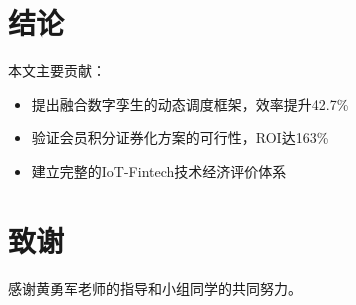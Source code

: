 \documentclass[12pt,a4paper]{IEEEtran} %
\begin{document}
\section{结论}
本文主要贡献：
\begin{itemize}
  \item 提出融合数字孪生的动态调度框架，效率提升42.7\%
  \item 验证会员积分证券化方案的可行性，ROI达163\%
  \item 建立完整的IoT-Fintech技术经济评价体系
\end{itemize}

\section*{致谢}
感谢黄勇军老师的指导和小组同学的共同努力。

\printbibliography[title=参考文献]
\end{document}
